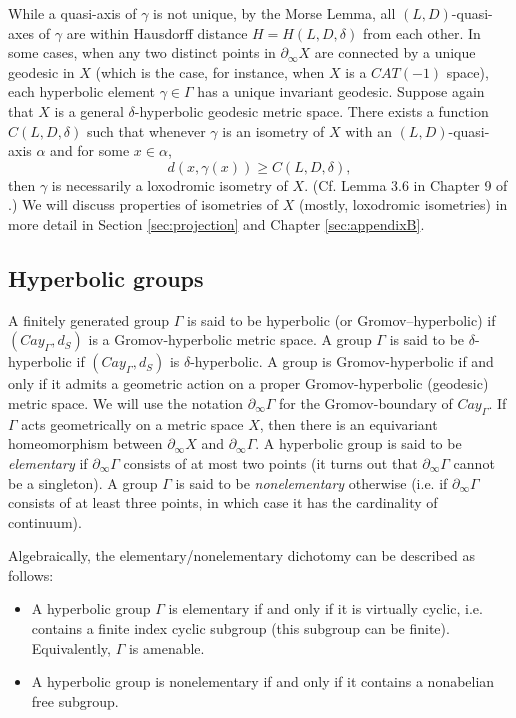 \documentclass[12pt]{amsbook}%
\theoremstyle{definition}
\theoremstyle{remark}
\numberwithin{section}{chapter}
\numberwithin{subsection}{section}
\numberwithin{figure}{chapter}
\def\Ga{\Gamma}
\def\ga{\gamma}
\def\geo{\partial_\infty}
\begin{document}
While a quasi-axis of $\gamma$ is not unique, by the Morse Lemma, all $(L,D)$-quasi-axes of $\gamma$ are within Hausdorff distance $H=H(L,D,\delta)$ from each other. In some cases, when any two distinct points in $\geo X$ are connected by a unique geodesic in $X$ (which is the case, for instance, when $X$ is a $CAT(-1)$ space), each hyperbolic element $\gamma\in \Gamma$ has a unique invariant geodesic. Suppose again that $X$ is a general $\delta$-hyperbolic geodesic metric space. There exists  a function $C(L,D,\delta)$ such that whenever $\ga$ is an isometry of $X$ with an $(L,D)$-quasi-axis $\alpha$ and 
for some $x\in \alpha$,
$$
d(x, \gamma(x))\geqslant C(L,D,\delta),
$$
then $\gamma$ is necessarily a loxodromic isometry of $X$. (Cf. Lemma 3.6 in Chapter 9 of \cite{CDP}.) We will discuss properties of isometries of $X$ (mostly, 
loxodromic isometries) in more detail in Section \ref{sec:projection} and Chapter \ref{sec:appendixB}. 

\subsection{Hyperbolic groups}\label{sec:Hyperbolic groups}

A finitely generated group $\Ga$ is said to be hyperbolic (or Gromov--hyper\-bolic) if $(Cay_\Ga, d_S)$ is a  
Gromov-hyperbolic metric space. A group $\Ga$ is said to be $\delta$-hyperbolic if $(Cay_\Ga, d_S)$ is $\delta$-hyperbolic. 
A group is Gromov-hyperbolic if and only if it admits a geometric action on a proper Gromov-hyperbolic 
(geodesic) metric space. We will use the notation $\geo\Ga$ for the Gromov-boundary of $Cay_\Ga$. If $\Ga$ acts geometrically on a 
metric space $X$, then there is an equivariant homeomorphism between $\geo X$ and $\geo \Ga$. A hyperbolic group is said to be {\em elementary} if $\geo \Ga$ consists of at most two points (it turns out that $\geo \Ga$ cannot be a singleton). A group $\Ga$ is said to be 
{\em nonelementary} otherwise (i.e. if $\geo \Ga$ consists of at least three points, in which case it has the cardinality of continuum). 

Algebraically, the elementary/nonelementary dichotomy can be described as follows:

\begin{itemize}

\item A hyperbolic group $\Ga$ is elementary if and only if it is virtually cyclic, i.e. contains a finite index cyclic subgroup (this subgroup can be finite). Equivalently, $\Ga$ is amenable. 

\item A hyperbolic group is nonelementary if and only if it contains a nonabelian free subgroup. 
\end{itemize}
\end{document}
